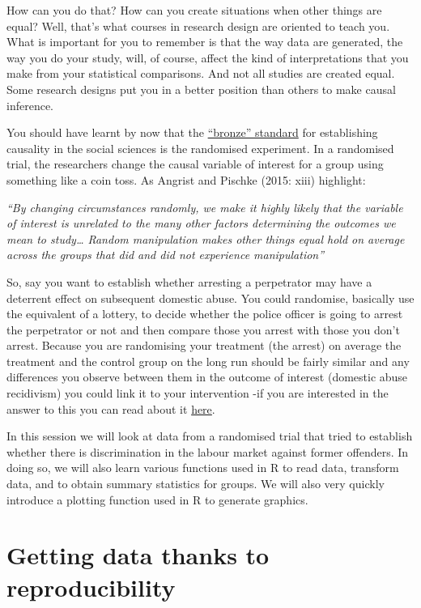 \documentclass[
]{book}
\begin{document}
How can you do that? How can you create situations when other things are equal? Well, that's what courses in research design are oriented to teach you. What is important for you to remember is that the way data are generated, the way you do your study, will, of course, affect the kind of interpretations that you make from your statistical comparisons. And not all studies are created equal. Some research designs put you in a better position than others to make causal inference.

You should have learnt by now that the \href{https://link.springer.com/article/10.1007/s11292-005-3538-2}{``bronze'' standard} for establishing causality in the social sciences is the randomised experiment. In a randomised trial, the researchers change the causal variable of interest for a group using something like a coin toss. As Angrist and Pischke (2015: xiii) highlight:

\emph{``By changing circumstances randomly, we make it highly likely that the variable of interest is unrelated to the many other factors determining the outcomes we mean to study\ldots{} Random manipulation makes other things equal hold on average across the groups that did and did not experience manipulation''}

So, say you want to establish whether arresting a perpetrator may have a deterrent effect on subsequent domestic abuse. You could randomise, basically use the equivalent of a lottery, to decide whether the police officer is going to arrest the perpetrator or not and then compare those you arrest with those you don't arrest. Because you are randomising your treatment (the arrest) on average the treatment and the control group on the long run should be fairly similar and any differences you observe between them in the outcome of interest (domestic abuse recidivism) you could link it to your intervention -if you are interested in the answer to this you can read about it \href{https://www.ojp.gov/pdffiles1/nij/188199.pdf}{here}.

In this session we will look at data from a randomised trial that tried to establish whether there is discrimination in the labour market against former offenders. In doing so, we will also learn various functions used in R to read data, transform data, and to obtain summary statistics for groups. We will also very quickly introduce a plotting function used in R to generate graphics.

\section{Getting data thanks to reproducibility}\label{getting-data-thanks-to-reproducibility}
\end{document}

